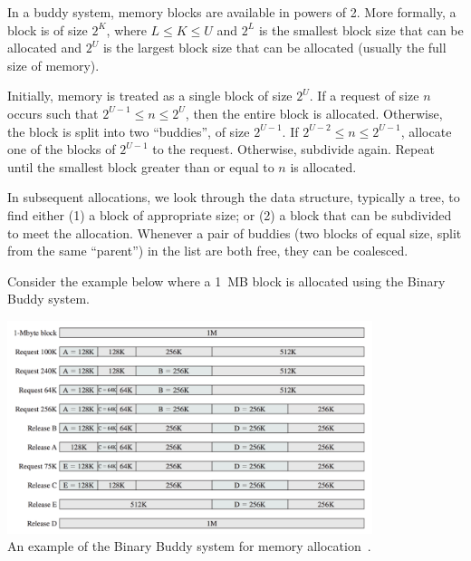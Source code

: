 In a buddy system, memory blocks are available in powers of 2. More formally, a block is of size $2^{K}$, where $L \leq K \leq U$ and $2^{L}$ is the smallest block size that can be allocated and $2^{U}$ is the largest block size that can be allocated (usually the full size of memory). 

Initially, memory is treated as a single block of size $2^{U}$. If a request of size $n$ occurs such that $2^{U-1} \leq n \leq 2^{U}$, then the entire block is allocated. Otherwise, the block is split into two ``buddies'', of size $2^{U-1}$. If $2^{U-2} \leq n \leq 2^{U-1}$, allocate one of the blocks of $2^{U-1}$ to the request. Otherwise, subdivide again. Repeat until the smallest block greater than or equal to $n$ is allocated. 

In subsequent allocations, we look through the data structure, typically a tree, to find either (1) a block of appropriate size; or (2) a block that can be subdivided to meet the allocation. Whenever a pair of buddies (two blocks of equal size, split from the same ``parent'') in the list are both free, they can be coalesced.

Consider the example below where a 1~MB block is allocated using the Binary Buddy system.

\begin{center}
\includegraphics[width=0.80\textwidth]{images/binary-buddy.png}\\
An example of the Binary Buddy system for memory allocation~\cite{osi}.
\end{center}



